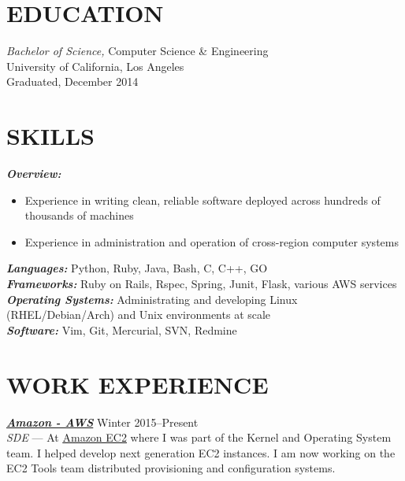 \documentclass[line,letterpaper]{resume}
\begin{document}
\address{\ }
\address{\ }


\begin{resume}
    \vspace{-24pt}
    \section{\uppercase{Education}} {\sl Bachelor of Science,} \/
    Computer Science \& Engineering \\
    University of California, Los Angeles\\
    Graduated, December 2014 \\

    \vspace{-16pt}

 \section{\uppercase{Skills}}
    {\sl\textbf{Overview:}}\/
	\begin{itemize}
		\item Experience in writing clean, reliable software deployed across hundreds of thousands of machines
		\item Experience in administration and operation of cross-region computer systems
	\end{itemize}
    {\sl\textbf{Languages:}}\/
    Python, Ruby, Java, Bash, C, C++, GO \\
    {\sl\textbf{Frameworks:}}\/
	Ruby on Rails, Rspec, Spring, Junit, Flask, various AWS services\\
    {\sl\textbf{Operating Systems:}}\/
	Administrating and developing Linux (RHEL/Debian/Arch) and Unix environments at scale\\
    {\sl\textbf{Software:}}\/
	Vim, Git, Mercurial, SVN, Redmine
    \vspace{-6pt}

	\section{\uppercase{Work Experience}}

	{\sl\textbf{\href{https://aws.amazon.com/}{Amazon - AWS}}} \hfill Winter 2015--Present\\
    \emph{SDE} --- At \underline{\href{http://aws.amazon.com/ec2}
	{Amazon EC2}} where I was part of the Kernel and Operating System team. I helped
	develop next generation EC2 instances. I am now working on the EC2 Tools team
    distributed provisioning and configuration systems.


\end{resume}
\end{document}
